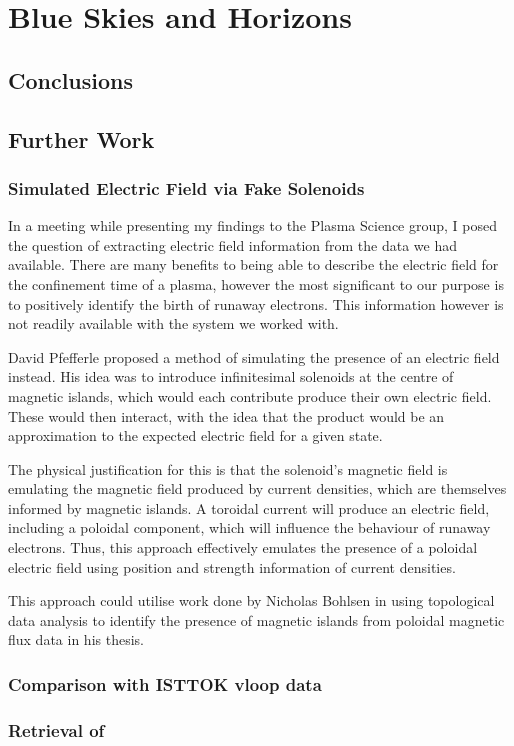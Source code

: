
\chapter{Blue Skies and Horizons}
\label{chapter6}

\section{Conclusions}

\section{Further Work}

\subsection{Simulated Electric Field via Fake Solenoids}

In a meeting while presenting my findings to the Plasma Science group, I 
posed the question of extracting electric field information from the data 
we had available. There are many benefits to being able to describe the 
electric field for the confinement time of a plasma, however the 
most significant to our purpose is to positively identify the 
birth of runaway electrons. This information however is not readily 
available with the system we worked with.

David Pfefferle proposed a method of simulating the presence of 
an electric field instead. His idea was to introduce infinitesimal 
solenoids at the centre of magnetic islands, which would each contribute 
produce their own electric field. These would then interact, with the idea 
that the product would be an approximation to the expected 
electric field for a given state. 

The physical justification for this is that the solenoid's magnetic field is 
emulating the magnetic field produced by current densities, which 
are themselves informed by magnetic islands. A toroidal current 
will produce an electric field, including a poloidal component, which 
will influence the behaviour of runaway electrons. Thus, this approach 
effectively emulates the presence of a poloidal electric field using 
position and strength information of current densities.

This approach could utilise work done by Nicholas Bohlsen in using topological 
data analysis to identify the presence of magnetic islands from poloidal magnetic flux data in his thesis.

\subsection{Comparison with ISTTOK vloop data}

\subsection{Retrieval of }

